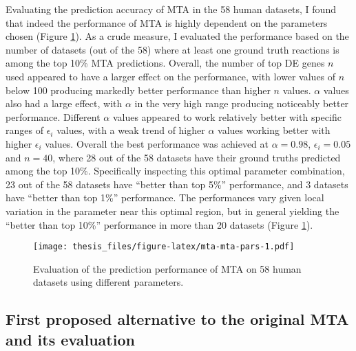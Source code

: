 \documentclass[12pt,twoside,openany,\mydriver]{thesis}  %
\begin{document}
Evaluating the prediction accuracy of MTA in the 58 human datasets, I found that indeed the performance of MTA is highly dependent on the parameters chosen (Figure \ref{fig:mta-mta-pars}). As a crude measure, I evaluated the performance based on the number of datasets (out of the 58) where at least one ground truth reactions is among the top 10\% MTA predictions. Overall, the number of top DE genes \(n\) used appeared to have a larger effect on the performance, with lower values of \(n\) below 100 producing markedly better performance than higher \(n\) values. \(\alpha\) values also had a large effect, with \(\alpha\) in the very high range producing noticeably better performance. Different \(\alpha\) values appeared to work relatively better with specific ranges of \(\epsilon_i\) values, with a weak trend of higher \(\alpha\) values working better with higher \(\epsilon_i\) values. Overall the best performance was achieved at \(\alpha=0.98\), \(\epsilon_i=0.05\) and \(n=40\), where 28 out of the 58 datasets have their ground truths predicted among the top 10\%. Specifically inspecting this optimal parameter combination, 23 out of the 58 datasets have ``better than top 5\%'' performance, and 3 datasets have ``better than top 1\%'' performance. The performances vary given local variation in the parameter near this optimal region, but in general yielding the ``better than top 10\%'' performance in more than 20 datasets (Figure \ref{fig:mta-mta-pars}).
\begin{figure}
\centering
\texttt{[image: thesis\_files/figure-latex/mta-mta-pars-1.pdf]}
\caption{\label{fig:mta-mta-pars}Evaluation of the prediction performance of MTA on 58 human datasets using different parameters.}
\end{figure}
\hypertarget{first-proposed-alternative-to-the-original-mta-and-its-evaluation}{%
\subsection{First proposed alternative to the original MTA and its evaluation}\label{first-proposed-alternative-to-the-original-mta-and-its-evaluation}}
\end{document}

